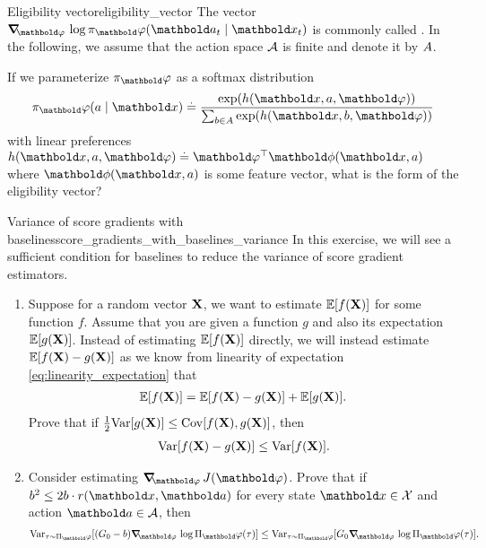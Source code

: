 \begin{nexercise}{Eligibility vector}{eligibility_vector}
  The vector $\grad_\vvarphi \log \pi_\vvarphi(\va_t \mid \vx_t)$ is commonly called .
  In the following, we assume that the action space $\mathcal{A}$ is finite and denote it by $A$.

  If we parameterize $\pi_\vvarphi$ as a softmax distribution \begin{align}
    \pi_\vvarphi(a \mid \vx) \defeq \frac{\exp(h(\vx, a, \vvarphi))}{\sum_{b \in \sA} \exp(h(\vx, b, \vvarphi))}
  \end{align} with linear preferences $h(\vx, a, \vvarphi) \defeq \transpose{\vvarphi} \vphi(\vx, a)$ where $\vphi(\vx, a)$ is some feature vector, what is the form of the eligibility vector?
\end{nexercise}

\begin{nexercise}{Variance of score gradients with baselines}{score_gradients_with_baselines_variance}
  In this exercise, we will see a sufficient condition for baselines to reduce the variance of score gradient estimators.

  \begin{enumerate}
    \item Suppose for a random vector $\mathbf{X}$, we want to estimate $\E{f(\rX)}$ for some function $f$.
    Assume that you are given a function $g$ and also its expectation $\E{g(\rX)}$.
    Instead of estimating $\E{f(\rX)}$ directly, we will instead estimate $\E{f(\rX) - g(\rX)}$ as we know from linearity of expectation \eqref{eq:linearity_expectation} that \begin{align*}
      \E{f(\rX)} = \E{f(\rX) - g(\rX)} + \E{g(\rX)}.
    \end{align*}
    Prove that if $\frac{1}{2} \Var{g(\rX)} \leq \Cov{f(\rX), g(\rX)}$, then \begin{align}
      \Var{f(\rX) - g(\rX)} \leq \Var{f(\rX)}. \label{eq:variance_reduction}
    \end{align}

    \item Consider estimating $\grad_\vvarphi \j{\vvarphi}$.
    Prove that if $b^2 \leq 2 b \cdot r(\vx, \va)$ for every state $\vx \in \spX$ and action $\va \in \spA$, then \begin{align}
      \Var[\tau \sim \altpi_\vvarphi]{(G_0 - b) \grad_\vvarphi \log \altpi_\vvarphi(\tau)} \leq \Var[\tau \sim \altpi_\vvarphi]{G_0 \grad_\vvarphi \log \altpi_\vvarphi(\tau)}.
    \end{align}
  \end{enumerate}
\end{nexercise}

